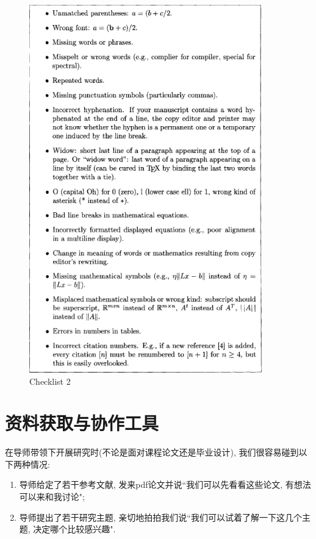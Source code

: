 \documentclass{formatBook}
\begin{document}
\begin{figure}[htb]
    \centering
    \includegraphics[width=0.9\textwidth]{figure/Figure 8.2.png}
    \caption{Checklist 2}
    \label{fig:my_label}
\end{figure}
\chapter{资料获取与协作工具}
在导师带领下开展研究时(不论是面对课程论文还是毕业设计), 我们很容易碰到以下两种情况:
\begin{enumerate}
    \item 导师给定了若干参考文献, 发来pdf论文并说``我们可以先看看这些论文, 有想法可以来和我讨论";
    \item 导师提出了若干研究主题, 亲切地拍拍我们说``我们可以试着了解一下这几个主题, 决定哪个比较感兴趣".
\end{enumerate}
\end{document}
